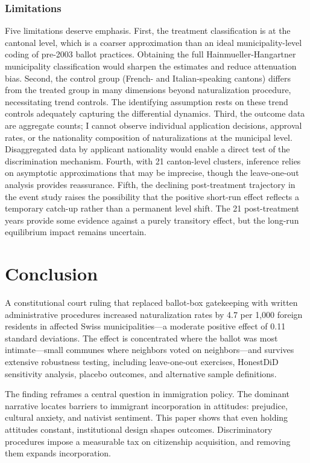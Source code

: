 \documentclass[12pt]{article}
\begin{document}
\subsubsection*{Limitations} Five limitations deserve emphasis. First, the treatment classification is at the cantonal level, which is a coarser approximation than an ideal municipality-level coding of pre-2003 ballot practices. Obtaining the full Hainmueller-Hangartner municipality classification would sharpen the estimates and reduce attenuation bias. Second, the control group (French- and Italian-speaking cantons) differs from the treated group in many dimensions beyond naturalization procedure, necessitating trend controls. The identifying assumption rests on these trend controls adequately capturing the differential dynamics. Third, the outcome data are aggregate counts; I cannot observe individual application decisions, approval rates, or the nationality composition of naturalizations at the municipal level. Disaggregated data by applicant nationality would enable a direct test of the discrimination mechanism. Fourth, with 21 canton-level clusters, inference relies on asymptotic approximations that may be imprecise, though the leave-one-out analysis provides reassurance. Fifth, the declining post-treatment trajectory in the event study raises the possibility that the positive short-run effect reflects a temporary catch-up rather than a permanent level shift. The 21 post-treatment years provide some evidence against a purely transitory effect, but the long-run equilibrium impact remains uncertain.


\section{Conclusion}\label{sec:conclusion}

A constitutional court ruling that replaced ballot-box gatekeeping with written administrative procedures increased naturalization rates by 4.7 per 1,000 foreign residents in affected Swiss municipalities---a moderate positive effect of 0.11 standard deviations. The effect is concentrated where the ballot was most intimate---small communes where neighbors voted on neighbors---and survives extensive robustness testing, including leave-one-out exercises, HonestDiD sensitivity analysis, placebo outcomes, and alternative sample definitions.

The finding reframes a central question in immigration policy. The dominant narrative locates barriers to immigrant incorporation in attitudes: prejudice, cultural anxiety, and nativist sentiment. This paper shows that even holding attitudes constant, institutional design shapes outcomes. Discriminatory procedures impose a measurable tax on citizenship acquisition, and removing them expands incorporation.
\end{document}
